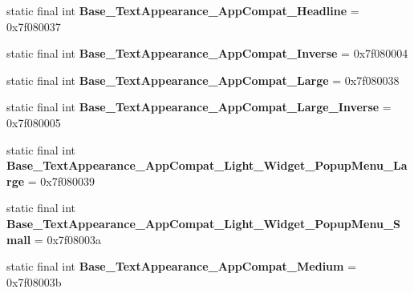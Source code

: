 \begin{DoxyCompactItemize}
\item 
\hypertarget{classandroid_1_1support_1_1v7_1_1appcompat_1_1_r_1_1style_a76b5b2690dec115d1cb2ab231a53b3e3}{}static final int {\bfseries Base\+\_\+\+Text\+Appearance\+\_\+\+App\+Compat\+\_\+\+Headline} = 0x7f080037\label{classandroid_1_1support_1_1v7_1_1appcompat_1_1_r_1_1style_a76b5b2690dec115d1cb2ab231a53b3e3}

\item 
\hypertarget{classandroid_1_1support_1_1v7_1_1appcompat_1_1_r_1_1style_ac1b8f71eef0cfd92420b53d40b848492}{}static final int {\bfseries Base\+\_\+\+Text\+Appearance\+\_\+\+App\+Compat\+\_\+\+Inverse} = 0x7f080004\label{classandroid_1_1support_1_1v7_1_1appcompat_1_1_r_1_1style_ac1b8f71eef0cfd92420b53d40b848492}

\item 
\hypertarget{classandroid_1_1support_1_1v7_1_1appcompat_1_1_r_1_1style_ac0e1bd870f1c3957fda8a93a43cc2248}{}static final int {\bfseries Base\+\_\+\+Text\+Appearance\+\_\+\+App\+Compat\+\_\+\+Large} = 0x7f080038\label{classandroid_1_1support_1_1v7_1_1appcompat_1_1_r_1_1style_ac0e1bd870f1c3957fda8a93a43cc2248}

\item 
\hypertarget{classandroid_1_1support_1_1v7_1_1appcompat_1_1_r_1_1style_a952c581262566629af4bcce8dcb124fe}{}static final int {\bfseries Base\+\_\+\+Text\+Appearance\+\_\+\+App\+Compat\+\_\+\+Large\+\_\+\+Inverse} = 0x7f080005\label{classandroid_1_1support_1_1v7_1_1appcompat_1_1_r_1_1style_a952c581262566629af4bcce8dcb124fe}

\item 
\hypertarget{classandroid_1_1support_1_1v7_1_1appcompat_1_1_r_1_1style_a7bdfa04a7bd06b56701a037df0d1d2df}{}static final int {\bfseries Base\+\_\+\+Text\+Appearance\+\_\+\+App\+Compat\+\_\+\+Light\+\_\+\+Widget\+\_\+\+Popup\+Menu\+\_\+\+Large} = 0x7f080039\label{classandroid_1_1support_1_1v7_1_1appcompat_1_1_r_1_1style_a7bdfa04a7bd06b56701a037df0d1d2df}

\item 
\hypertarget{classandroid_1_1support_1_1v7_1_1appcompat_1_1_r_1_1style_acf3a49f92e11ba58887e56c6237d01b2}{}static final int {\bfseries Base\+\_\+\+Text\+Appearance\+\_\+\+App\+Compat\+\_\+\+Light\+\_\+\+Widget\+\_\+\+Popup\+Menu\+\_\+\+Small} = 0x7f08003a\label{classandroid_1_1support_1_1v7_1_1appcompat_1_1_r_1_1style_acf3a49f92e11ba58887e56c6237d01b2}

\item 
\hypertarget{classandroid_1_1support_1_1v7_1_1appcompat_1_1_r_1_1style_a052584a879536e446cb21f559053a2fd}{}static final int {\bfseries Base\+\_\+\+Text\+Appearance\+\_\+\+App\+Compat\+\_\+\+Medium} = 0x7f08003b\label{classandroid_1_1support_1_1v7_1_1appcompat_1_1_r_1_1style_a052584a879536e446cb21f559053a2fd}


\end{DoxyCompactItemize}
